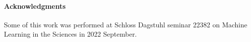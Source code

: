 \documentclass{article}
\newcommand{\T}{^\top}
\newcommand{\surf}{{\mathrm{s}}}
\begin{document}



\paragraph{Acknowledgments}
Some of this work was performed at Schloss Dagstuhl seminar 22382 on Machine Learning in the Sciences in 2022 September.


\raggedright

\end{document}
